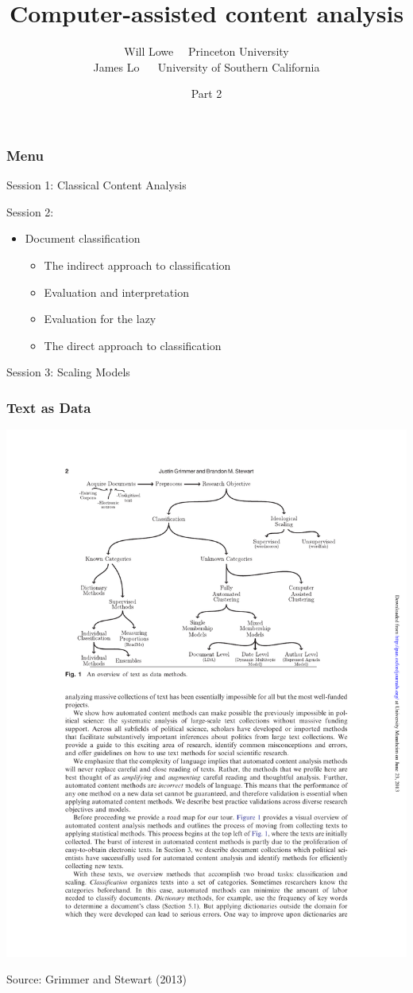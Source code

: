 \documentclass[11pt,compress,professionalfonts]{beamer}
\title{Computer-assisted content analysis}
\author{Will Lowe ~~Princeton University\\James Lo ~~ University of Southern California}
\date{Part 2}
\newcommand{\ita}{\begin{itemize}}
\newcommand{\itm}{\item[]}
\newcommand{\itz}{\end{itemize}}
\begin{document}
\maketitle

%
%
%
%
%


%

\begin{frame}[t,fragile]\frametitle{Menu}

Session 1: Classical Content Analysis

Session 2:
\ita
\itm Document classification
\ita
\itm The indirect approach to classification
\itm Evaluation and interpretation
\itm Evaluation for the lazy
\itm The direct approach to classification
\itz
\itz

Session 3: Scaling Models

\end{frame}
\begin{frame}[t,fragile]\frametitle{Text as Data}

\centerline{\includegraphics[scale=.9]{pictures/grimmerovreview.pdf}}
\centerline{\footnotesize Source: Grimmer and Stewart (2013)}






\end{frame}
\end{document}
